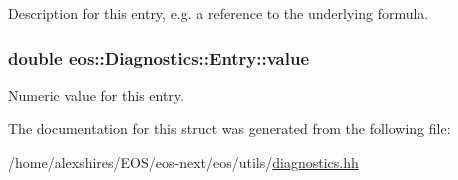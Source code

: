 Description for this entry, e.g. a reference to the underlying formula. \hypertarget{structeos_1_1Diagnostics_1_1Entry_a979ae5967f4627300e5db3d5db042b26}{
\subsubsection[{value}]{\setlength{\rightskip}{0pt plus 5cm}double {\bf eos::Diagnostics::Entry::value}}}
\label{structeos_1_1Diagnostics_1_1Entry_a979ae5967f4627300e5db3d5db042b26}


Numeric value for this entry. 

The documentation for this struct was generated from the following file:\begin{DoxyCompactItemize}
\item 
/home/alexshires/EOS/eos-\/next/eos/utils/\hyperlink{diagnostics_8hh}{diagnostics.hh}\end{DoxyCompactItemize}
